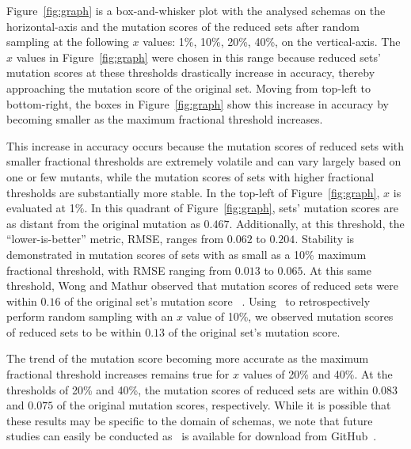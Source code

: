 Figure~\ref{fig:graph} is a box-and-whisker plot with the analysed schemas on the horizontal-axis and the mutation
scores of the reduced sets after random sampling at the following $x$ values: 1\%, 10\%, 20\%, 40\%, on the
vertical-axis. The $x$ values in Figure~\ref{fig:graph} were chosen in this range because reduced sets' mutation scores
at these thresholds drastically increase in accuracy, thereby approaching the mutation score of the original set. Moving
from top-left to bottom-right, the boxes in Figure~\ref{fig:graph} show this increase in accuracy by becoming smaller as
the maximum fractional threshold increases.

This increase in accuracy occurs because the mutation scores of reduced sets with smaller fractional thresholds are
extremely volatile and can vary largely based on one or few mutants, while the mutation scores of sets with higher
fractional thresholds are substantially more stable. In the top-left of Figure~\ref{fig:graph}, $x$ is evaluated at 1\%.
In this quadrant of Figure~\ref{fig:graph}, sets' mutation scores are as distant from the original mutation as $0.467$.
Additionally, at this threshold, the ``lower-is-better'' metric, RMSE, ranges from $0.062$ to $0.204$.  Stability is
demonstrated in mutation scores of sets with as small as a 10\% maximum fractional threshold, with RMSE ranging from
$0.013$ to $0.065$.  At this same threshold, Wong and Mathur observed that mutation scores of reduced sets were within
$0.16$ of the original set's mutation score ~\cite{mathur1994empirical, wong1993mutation}. Using \mr~to retrospectively
perform random sampling with an $x$ value of 10\%, we observed mutation scores of reduced sets to be within $0.13$ of
the original set's mutation score.

The trend of the mutation score becoming more accurate as the maximum fractional threshold increases remains true for
$x$ values of 20\% and 40\%. At the thresholds of 20\% and 40\%, the mutation scores of reduced sets are within $0.083$
and $0.075$ of the original mutation scores, respectively. While it is possible that these results may be specific to
the domain of schemas, we note that future studies can easily be conducted as \mr~is available for download from
GitHub~\cite{tool}.



